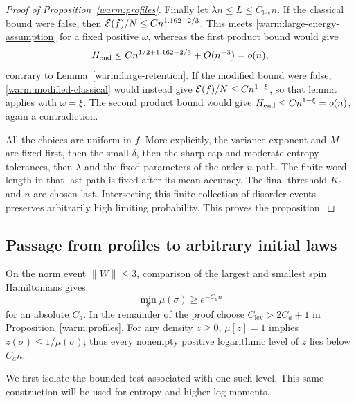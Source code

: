 \begin{proof}[Proof of Proposition~\ref{warm:profiles}]
Finally let \(\lambda n\le L\le C_{\mathrm{lev}}n\).  If the classical bound
were false, then
\(\mathcal E(f)/N\le Cn^{1.162-2/3}\).  This meets
\eqref{warm:large-energy-assumption} for a fixed positive
\(\omega\), whereas the first product bound would give
\[
 H_{\rm end}\le Cn^{1/2+1.162-2/3}+O(n^{-3})=o(n),
\]
contrary to Lemma~\ref{warm:large-retention}.  If the modified bound
were false, \eqref{warm:modified-classical} would instead give
\(\mathcal E(f)/N\le Cn^{1-\xi}\), so that lemma applies with
\(\omega=\xi\).  The second product bound would give
\(H_{\rm end}\le Cn^{1-\xi}=o(n)\), again a contradiction.

All the choices are uniform in \(f\).  More explicitly, the
variance exponent and \(M\) are fixed first, then the small
\(\delta\), then the sharp cap and moderate-entropy tolerances,
then \(\lambda\) and the fixed parameters of the order-\(n\) path.
The finite word length in that last path is fixed after its mean
accuracy.  The final threshold \(K_0\) and \(n\) are chosen last.
Intersecting this finite collection of disorder events preserves
arbitrarily high limiting probability.  This proves the proposition.
\end{proof}

\subsection{Passage from profiles to arbitrary initial laws}
\label{warm:layers-section}

On the norm event \(\|W\|\le3\), comparison of the largest and
smallest spin Hamiltonians gives
\begin{equation}
 \min_\sigma\mu(\sigma)\ge e^{-C_a n}                     \label{warm:atom}
\end{equation}
for an absolute \(C_a\).  In the remainder of the proof choose
\(C_{\mathrm{lev}}>2C_a+1\) in Proposition~\ref{warm:profiles}.  For any density
\(z\ge0\), \(\mu[z]=1\) implies \(z(\sigma)\le1/\mu(\sigma)\);
thus every nonempty positive logarithmic level of \(z\) lies below
\(C_a n\).

We first isolate the bounded test associated with one such level.
This same construction will be used for entropy and higher log moments.

